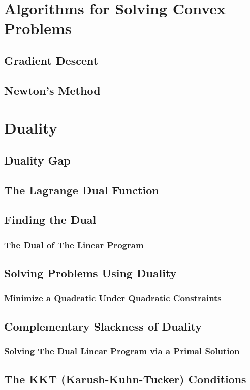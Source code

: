 \documentclass{article}
\begin{document}
\section{Algorithms for Solving Convex Problems}

\subsection{Gradient Descent}

\subsection{Newton's Method}

\section{Duality}

\subsection{Duality Gap}

\subsection{The Lagrange Dual Function}

\subsection{Finding the Dual}

\subsubsection{The Dual of The Linear Program}

\subsection{Solving Problems Using Duality}

\subsubsection{Minimize a Quadratic Under Quadratic Constraints}

\subsection{Complementary Slackness of Duality}

\subsubsection{Solving The Dual Linear Program via a Primal Solution}

\subsection{The KKT (Karush-Kuhn-Tucker) Conditions}
\end{document}
